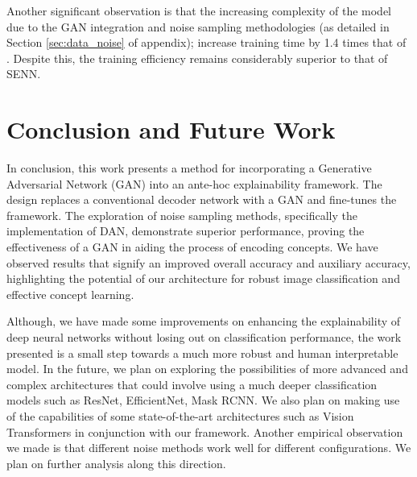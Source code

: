 \documentclass[letterpaper]{article}
\begin{document}
Another significant observation is that the increasing complexity of the model due to the GAN integration and noise sampling methodologies (as detailed in Section \ref{sec:data_noise} of appendix); increase training time by 1.4 times that of \cite{Sarkar2021AFF}. Despite this, the training efficiency remains considerably superior to that of SENN.





\section{Conclusion and Future Work}\label{sec:conclusion}
In conclusion, this work presents a method for incorporating a Generative Adversarial Network (GAN) into an ante-hoc explainability framework. The design replaces a conventional decoder network with a GAN and fine-tunes the framework. The exploration of noise sampling methods, specifically the implementation of DAN, demonstrate superior performance, proving the effectiveness of a GAN in aiding the process of encoding concepts. 
We have observed results that signify an improved overall accuracy and auxiliary accuracy, highlighting the potential of our architecture for robust image classification and effective concept learning. 

Although, we have made some improvements on enhancing the explainability of deep neural networks without losing out on classification performance, the work presented is a small step towards a much more robust and human interpretable model.
In the future, we plan on exploring the possibilities of more advanced and complex architectures that could involve using a much deeper classification models such as ResNet, EfficientNet, Mask RCNN. We also plan on making use of the capabilities of some state-of-the-art architectures such as Vision Transformers in conjunction with our framework. Another empirical observation we made is that different noise methods work well for different configurations. We plan on further analysis along this direction.


% 


\appendix
\end{document}
